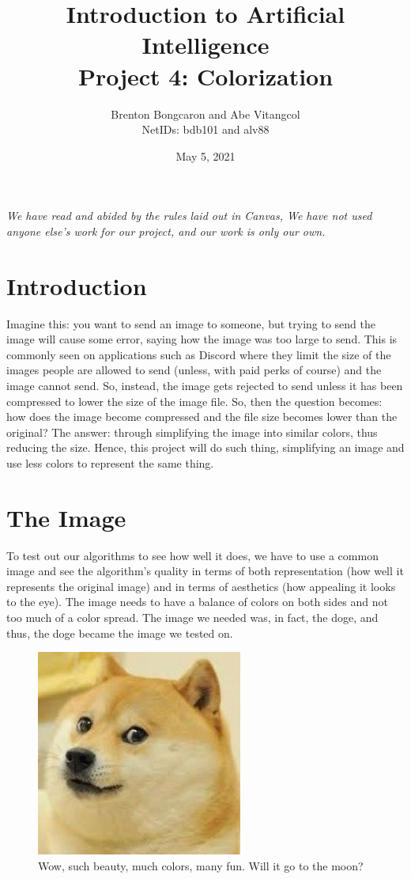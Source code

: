 \documentclass[11pt]{article}
\title{\textbf{Introduction to Artificial Intelligence\\
		\large Project 4: Colorization}}
\author{Brenton Bongcaron and Abe Vitangcol\\NetIDs: bdb101 and alv88}
\date{May 5, 2021}
\begin{document}
	\maketitle
\textit{We have read and abided by the rules laid out in Canvas, We have not used anyone else's work for our project, and our work is only our own.}
\tableofcontents
\listoffigures
\pagebreak
\section{Introduction}

Imagine this: you want to send an image to someone, but trying to send the image will cause some error, saying how the image was too large to send. This is commonly seen on applications such as Discord where they limit the size of the images people are allowed to send (unless, with paid perks of course) and the image cannot send. So, instead, the image gets rejected to send unless it has been compressed to lower the size of the image file. So, then the question becomes: how does the image become compressed and the file size becomes lower than the original? The answer: through simplifying the image into similar colors, thus reducing the size. Hence, this project will do such thing, simplifying an image and use less colors to represent the same thing.

\section{The Image}
To test out our algorithms to see how well it does, we have to use a common image and see the algorithm's quality in terms of both representation (how well it represents the original image) and in terms of aesthetics (how appealing it looks to the eye). The image needs to have a balance of colors on both sides and not too much of a color spread. The image we needed was, in fact, the doge, and thus, the doge became the image we tested on.

\begin{figure}[h]
\centering
\includegraphics[scale=1.10]{images/smoldoge.jpg}
\caption{Wow, such beauty, much colors, many fun. Will it go to the moon?}
\end{figure}
\end{document}
